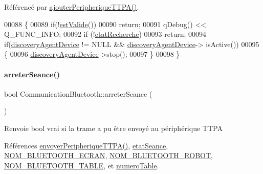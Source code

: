 Référencé par \hyperlink{class_communication_bluetooth_a53bc4772892ec57f030600e49fa0b6ff}{ajouter\+Peripherique\+T\+T\+P\+A()}.


\begin{DoxyCode}
00088 \{
00089     \textcolor{keywordflow}{if}(!\hyperlink{class_communication_bluetooth_a69f544bb71f5287689ee051511811669}{estValide}())
00090         \textcolor{keywordflow}{return};
00091     qDebug() << Q\_FUNC\_INFO;
00092     \textcolor{keywordflow}{if} (!\hyperlink{class_communication_bluetooth_a9e252653d4d3c6fa9c772b35bf0eb02f}{etatRecherche})
00093         \textcolor{keywordflow}{return};
00094     \textcolor{keywordflow}{if}(\hyperlink{class_communication_bluetooth_a9e04dbd88ba090525d6691cc1a4237b6}{discoveryAgentDevice} != NULL && \hyperlink{class_communication_bluetooth_a9e04dbd88ba090525d6691cc1a4237b6}{discoveryAgentDevice}->
      isActive())
00095     \{
00096         \hyperlink{class_communication_bluetooth_a9e04dbd88ba090525d6691cc1a4237b6}{discoveryAgentDevice}->stop();
00097     \}
00098 \}
\end{DoxyCode}
\mbox{\label{class_communication_bluetooth_a4b0e71c1f161c14278f3ab55b1910c64}} 
\paragraph{\texorpdfstring{arreter\+Seance()}{arreterSeance()}}
{\footnotesize\ttfamily bool Communication\+Bluetooth\+::arreter\+Seance (\begin{DoxyParamCaption}{ }\end{DoxyParamCaption})}

\begin{DoxyReturn}{Renvoie}
bool vrai si la trame a pu être envoyé au périphérique T\+T\+PA 
\end{DoxyReturn}


Références \hyperlink{class_communication_bluetooth_a73d95b841bf64a4463760435a41fc219}{envoyer\+Peripherique\+T\+T\+P\+A()}, \hyperlink{class_communication_bluetooth_adc66f3034d46f3964a26b62ad98e784f}{etat\+Seance}, \hyperlink{terminal-_t_t_p_a_2communicationbluetooth_8h_a2bd8beaaf0c4b59979a3f78d4c134ec8}{N\+O\+M\+\_\+\+B\+L\+U\+E\+T\+O\+O\+T\+H\+\_\+\+E\+C\+R\+AN}, \hyperlink{terminal-_t_t_p_a_2communicationbluetooth_8h_a47332bb9b30ed8b0f38fa7b5bd11fd47}{N\+O\+M\+\_\+\+B\+L\+U\+E\+T\+O\+O\+T\+H\+\_\+\+R\+O\+B\+OT}, \hyperlink{terminal-_t_t_p_a_2communicationbluetooth_8h_aa416b2be7573de0d7832248a27ba09a8}{N\+O\+M\+\_\+\+B\+L\+U\+E\+T\+O\+O\+T\+H\+\_\+\+T\+A\+B\+LE}, et \hyperlink{class_communication_bluetooth_a9428f8261f0cc055e9c6fed9a61cb595}{numero\+Table}.


